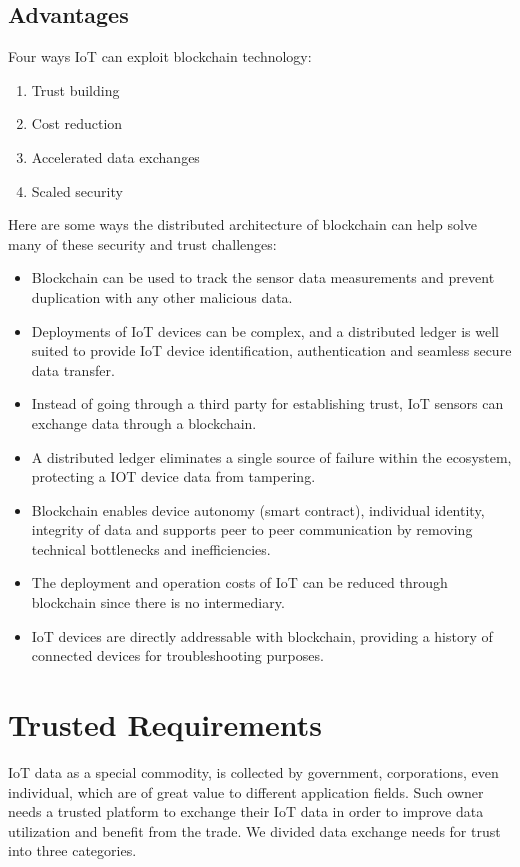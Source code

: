 \section{Advantages}
Four ways IoT can exploit blockchain technology:
\begin{enumerate}
\item Trust building
\item Cost reduction
\item Accelerated data exchanges
\item Scaled security
\end{enumerate}
Here are some ways the distributed architecture of blockchain can help solve many of these security and trust challenges:
\begin{itemize}
\item Blockchain can be used to track the sensor data measurements and prevent duplication with any other malicious data.

\item Deployments of IoT devices can be complex, and a distributed ledger is well suited to provide IoT device identification, authentication and seamless secure data transfer.

\item Instead of going through a third party for establishing trust, IoT sensors can exchange data through a blockchain.

\item A distributed ledger eliminates a single source of failure within the ecosystem, protecting a IOT device data from tampering.

\item Blockchain enables device autonomy (smart contract), individual identity, integrity of data and supports peer to peer communication by removing technical bottlenecks and inefficiencies.

\item The deployment and operation costs of IoT can be reduced through blockchain since there is no intermediary.

\item IoT devices are directly addressable with blockchain, providing a history of connected devices for troubleshooting purposes.
\end{itemize}

\chapter{ Trusted Requirements}
IoT data as a special commodity, is collected by
government, corporations, even individual, which are of
great value to different application fields. Such owner needs
a trusted platform to exchange their IoT data in order to
improve data utilization and benefit from the trade. We
divided data exchange needs for trust into three categories.
